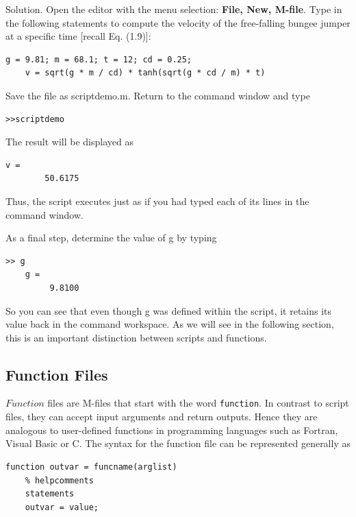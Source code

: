 \documentclass[../main.tex]{subfiles}
\begin{document}
Solution. Open the editor with the menu selection: \textbf{File, New, M-file}. Type in the following statements to compute
 the velocity of the free-falling bungee jumper at a specific time
[recall Eq. (1.9)]:

\begin{lstlisting}[frame=none, numbers=none]
    g = 9.81; m = 68.1; t = 12; cd = 0.25;
    v = sqrt(g * m / cd) * tanh(sqrt(g * cd / m) * t)
\end{lstlisting}



Save the file as scriptdemo.m. Return to the command window and type
\begin{lstlisting}[frame=none, numbers=none]
    >>scriptdemo
\end{lstlisting}
The result will be displayed as
\begin{lstlisting}[frame=none, numbers=none]
    v =
        50.6175
\end{lstlisting}
Thus, the script executes just as if you had typed each of its lines in the command window.


As a final step, determine the value of g by typing
\begin{lstlisting}[frame=none, numbers=none]
    >> g
    g =
         9.8100
\end{lstlisting}

So you can see that even though g was defined within the script, it retains its value back in
the command workspace. As we will see in the following section, this is an important distinction between scripts and functions.

\subsection{ Function Files}


$Function$ files are M-files that start with the word \texttt{function}. In contrast to script files, they
can accept input arguments and return outputs. Hence they are analogous to user-defined
functions in programming languages such as Fortran, Visual Basic or C.
The syntax for the function file can be represented generally as
\begin{lstlisting}[frame=none, numbers=none]
    function outvar = funcname(arglist)
    % helpcomments
    statements
    outvar = value;
\end{lstlisting}
\end{document}
